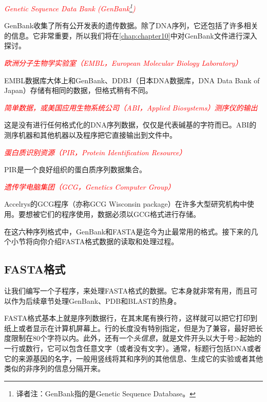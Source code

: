 \textcolor{red}{\textit{Genetic Sequence Data Bank (GenBank\footnote{译者注：GenBank指的是Genetic Sequence Database。})}}
\begin{adjustwidth}{1cm}{}
GenBank收集了所有公开发表的遗传数据。除了DNA序列，它还包括了许多相关的信息。它非常重要，所以我们将在\autoref{chap:chapter10}中对GenBank文件进行深入探讨。
\end{adjustwidth}

\textcolor{red}{\textit{欧洲分子生物学实验室（EMBL，European Molecular Biology Laboratory）}}
\begin{adjustwidth}{1cm}{}
EMBL数据库大体上和GenBank、DDBJ（日本DNA数据库，DNA Data Bank of Japan）存储有相同的数据，但格式稍有不同。
\end{adjustwidth}

\textcolor{red}{\textit{简单数据，或美国应用生物系统公司（ABI，Applied Biosystems）测序仪的输出}}
\begin{adjustwidth}{1cm}{}
这是没有进行任何格式化的DNA序列数据，仅仅是代表碱基的字符而已。ABI的测序机器和其他机器以及程序把它直接输出到文件中。
\end{adjustwidth}

\textcolor{red}{\textit{蛋白质识别资源（PIR，Protein Identification Resource）}}
\begin{adjustwidth}{1cm}{}
PIR是一个良好组织的蛋白质序列数据集合。
\end{adjustwidth}

\textcolor{red}{\textit{遗传学电脑集团（GCG，Genetics Computer Group）}}
\begin{adjustwidth}{1cm}{}
Accelrys的GCG程序（亦称GCG Wisconsin
package）在许多大型研究机构中使用。要想被它们的程序使用，数据必须以GCG格式进行存储。
\end{adjustwidth}

在这六种序列格式中，GenBank和FASTA是迄今为止最常用的格式。接下来的几个小节将向你介绍FASTA格式数据的读取和处理过程。

\subsection{FASTA格式}
让我们编写一个子程序，来处理FASTA格式的数据。它本身就非常有用，而且可以作为后续章节处理GenBank、PDB和BLAST的热身。

FASTA格式基本上就是序列数据行，在其末尾有换行符，这样就可以把它打印到纸上或者显示在计算机屏幕上。行的长度没有特别指定，但是为了兼容，最好把长度限制在80个字符以内。此外，还有一个\textit{头信息}，就是文件开头以大于号>起始的一行或数行，它可以包含任意文字（或者没有文字）。通常，标题行包括DNA或者它的来源基因的名字，一般用竖线将其和序列的其他信息、生成它的实验或者其他类似的非序列的信息分隔开来。

